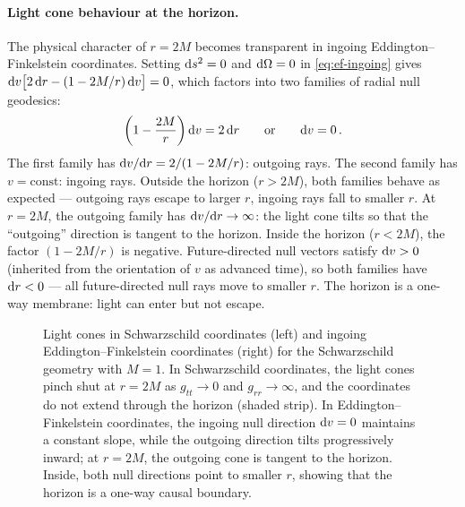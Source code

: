 \paragraph{Light cone behaviour at the horizon.}

The physical character of $r = 2M$ becomes transparent in ingoing
Eddington--Finkelstein coordinates.  Setting $\mathrm{d} s^2 = 0$ and
$\mathrm{d}\Omega = 0$ in \cref{eq:ef-ingoing} gives
$\mathrm{d} v\bigl[2\,\mathrm{d} r - (1 - 2M/r)\,\mathrm{d} v\bigr] = 0$, which factors
into two families of radial null geodesics:
%
\begin{equation}
  \left(1 - \frac{2M}{r}\right)\mathrm{d} v = 2\,\mathrm{d} r
  \qquad \text{or} \qquad \mathrm{d} v = 0 \,.
  \label{eq:ef-null-geodesics}
\end{equation}
%
The first family has $\mathrm{d} v/\mathrm{d} r = 2/(1 - 2M/r)$: outgoing rays.  The
second family has $v = \text{const}$: ingoing rays.  Outside the
horizon ($r > 2M$), both families behave as expected --- outgoing rays
escape to larger $r$, ingoing rays fall to smaller $r$.  At $r = 2M$,
the outgoing family has $\mathrm{d} v/\mathrm{d} r \to \infty$: the light cone tilts
so that the ``outgoing'' direction is tangent to the horizon.  Inside
the horizon ($r < 2M$), the factor $(1 - 2M/r)$ is negative.
Future-directed null vectors satisfy $\mathrm{d} v > 0$ (inherited from the
orientation of $v$ as advanced time), so both families have $\mathrm{d} r < 0$
--- all future-directed null rays move to smaller $r$.  The horizon is
a one-way membrane: light can enter but not escape.

%
\begin{figure}[htbp]
  \centering
  
  \caption[Light cones in Schwarzschild and Eddington--Finkelstein coordinates]{%
    Light cones in Schwarzschild coordinates (left) and ingoing
    Eddington--Finkelstein coordinates (right) for the Schwarzschild geometry
    with $M = 1$.  In Schwarzschild coordinates, the light cones pinch shut
    at $r = 2M$ as $g_{tt} \to 0$ and $g_{rr} \to \infty$, and the
    coordinates do not extend through the horizon (shaded strip).  In
    Eddington--Finkelstein coordinates, the ingoing null direction
    $\mathrm{d} v = 0$ maintains a constant slope, while the outgoing direction
    tilts progressively inward; at $r = 2M$, the outgoing cone is tangent
    to the horizon.  Inside, both null directions point to smaller $r$,
    showing that the horizon is a one-way causal boundary.}
  \label{fig:ef-light-cones}
\end{figure}

